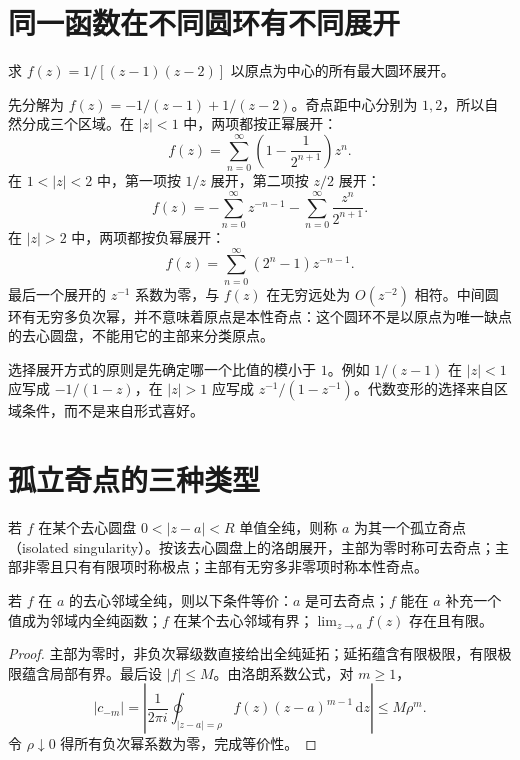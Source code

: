 \section{同一函数在不同圆环有不同展开}

\begin{example}[展开式必须附带适用区域]
\label{ex:ca-annuli}
求 $f(z)=1/[(z-1)(z-2)]$ 以原点为中心的所有最大圆环展开。
\end{example}
\begin{solve}
先分解为 $f(z)=-1/(z-1)+1/(z-2)$。奇点距中心分别为 $1,2$，所以自然分成三个区域。在 $|z|<1$ 中，两项都按正幂展开：
\[
 f(z)=\sum_{n=0}^\infty\left(1-\frac1{2^{n+1}}\right)z^n.
\]
在 $1<|z|<2$ 中，第一项按 $1/z$ 展开，第二项按 $z/2$ 展开：
\[
 f(z)=-\sum_{n=0}^\infty z^{-n-1}
 -\sum_{n=0}^\infty\frac{z^n}{2^{n+1}}.
\]
在 $|z|>2$ 中，两项都按负幂展开：
\[
 f(z)=\sum_{n=0}^\infty(2^n-1)z^{-n-1}.
\]
最后一个展开的 $z^{-1}$ 系数为零，与 $f(z)$ 在无穷远处为 $O(z^{-2})$ 相符。中间圆环有无穷多负次幂，并不意味着原点是本性奇点：这个圆环不是以原点为唯一缺点的去心圆盘，不能用它的主部来分类原点。
\end{solve}

选择展开方式的原则是先确定哪一个比值的模小于 $1$。例如 $1/(z-1)$ 在 $|z|<1$ 应写成 $-1/(1-z)$，在 $|z|>1$ 应写成 $z^{-1}/(1-z^{-1})$。代数变形的选择来自区域条件，而不是来自形式喜好。

\section{孤立奇点的三种类型}

\begin{definition}[孤立奇点]
若 $f$ 在某个去心圆盘 $0<|z-a|<R$ 单值全纯，则称 $a$ 为其一个孤立奇点（isolated singularity）。按该去心圆盘上的洛朗展开，主部为零时称可去奇点；主部非零且只有有限项时称极点；主部有无穷多非零项时称本性奇点。
\end{definition}

\begin{theorem}[可去奇点判别]
\label{thm:ca-removable}
若 $f$ 在 $a$ 的去心邻域全纯，则以下条件等价：$a$ 是可去奇点；$f$ 能在 $a$ 补充一个值成为邻域内全纯函数；$f$ 在某个去心邻域有界；$\lim_{z\to a}f(z)$ 存在且有限。
\end{theorem}
\begin{proof}
主部为零时，非负次幂级数直接给出全纯延拓；延拓蕴含有限极限，有限极限蕴含局部有界。最后设 $|f|\le M$。由洛朗系数公式，对 $m\ge1$，
\[
 |c_{-m}|=\left|\frac1{2\pi i}\oint_{|z-a|=\rho}f(z)(z-a)^{m-1}\,\mathrm dz\right|
 \le M\rho^m.
\]
令 $\rho\downarrow0$ 得所有负次幂系数为零，完成等价性。
\end{proof}

